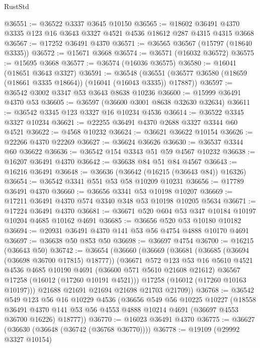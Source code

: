 \begin{lexlean}{RustStd}
\begin{coremodule}
@36551 := @36522 @3337 @3645 @10150
@36565 := @18602 @36491 @4370 @3335 @123 @16 @3643 @3327 @4521 @4536 @18612 @287 @4315 @4315 @3668
@36567 := @17252 @36491 @4370
@36571 := @36565 @36567 (@15797 (@18640 @3335))
@36572 := @15671 @3668
@36574 := @36571 (@16032 @36572)
@36575 := @15695 @3668
@36577 := @36574 (@16036 @36575)
@36580 := @16041 (@18651 @3643 @3327)
@36591 := @36548
    (@36551 (@36577 @36580 (@18659 (@18661 @3335 @18664)) (@16041 (@16043 @3335)) @17887))
@36597 := @36542 @3002 @3347 @53 @3643 @8638 @10236
@36600 := @15999 @36491 @4370 @53
@36605 := @36597 (@36600 @3001 @8638 @32630 @32634)
@36611 := @36542 @3345 @123 @3327 @16 @10234 @4536
@36614 := @36522 @3345 @3327 @10234
@36621 := @22255 @36491 @4370 @2688 @3327 @3344 @60 @4521
@36622 := @4568 @10232
@36624 := @36621 @36622 @10154
@36626 := @22266 @4370 @22269
@36627 := @36624 @36626
@36630 := @36537 @3344 @60 @36622
@36636 := @36542 @154 @3343 @51 @59 @4567 @10232
@36638 := @16207 @36491 @4370
@36642 := @36638 @84 @51 @84 @4567
@36643 := @16216 @36491
@36648 := @36636 (@36642 (@16215 (@36643 @84)) @16326)
@36654 := @36542 @3341 @551 @53 @58 @10209 @10231
@36656 := @17789 @36491 @4370
@36660 := @36656 @3341 @53 @10198 @10207
@36669 := @17211 @36491 @4370 @574 @3340 @348 @53 @10198 @10205 @5634
@36671 := @17224 @36491 @4370
@36681 := @36671 @520 @604 @53 @347 @10184 @10197 @10204 @4685 @10162 @4691
@36685 := @36656 @520 @53 @10180 @10182
@36694 := @20931 @36491 @4370 @141 @53 @56 @4754 @4888 @10170 @4691
@36697 := @36638 @50 @853 @50
@36698 := @36697 @4754
@36700 := @16215 (@36643 @50)
@36742 := @36654
    (@36660
      (@36669
        (@36681
          (@36685 (@36694 (@36698 @36700 @17815) @18777))
          (@36671
            @572
            @123
            @53
            @16
            @5610
            @4521
            @4536
            @4685
            @10190
            @4691
            (@36600 @571 @5610 @21608 @21612)
            @36567
            @17258
            (@16012 (@17260 @10191 @4521)))
          @17258
          (@16012 (@17260 @10163 @10197)))
        @21688
        @21691
        @21694
        @21698
        @21703
        @21709))
@36768 := @36542
    @549
    @123
    @56
    @16
    @10229
    @4536
    (@36656
      @549
      @56
      @10225
      @10227
      (@18558
        @36491
        @4370
        @141
        @53
        @56
        @4553
        @4888
        @10214
        @4691
        (@36697 @4553 @36700 @16226)
        @18777))
@36770 := @16023 @36491 @4370
@36775 := @36627 (@36630 (@36648 (@36742 (@36768 @36770))))
@36778 := @19109 (@29992 @3327 @10154)

\end{coremodule}
\end{lexlean}
